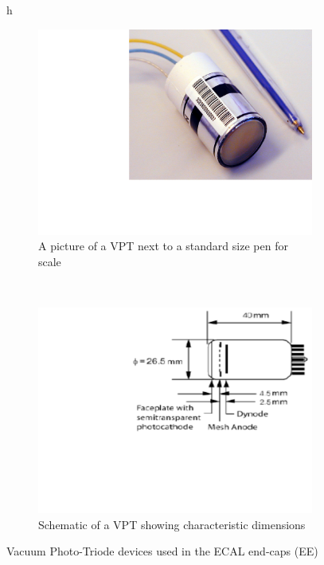 \begin{figure}{h}
    \centering
    \begin{subfigure}[h]{0.450\textwidth}
        \includegraphics[width=\textwidth]{Figures/CMS_Diagrams/ECAL__VPT.pdf}
        \caption{A picture of a VPT next to a standard size pen for
          scale \cite{CMS:ecal_vpt_with_pen}}\label{fig:ecal_vpt_pic}
      \end{subfigure}
      ~ %
    \begin{subfigure}[h]{0.450\textwidth}
        \includegraphics[width=\textwidth]{Figures/CMS_Diagrams/ECAL__VPT_schematic.pdf}
        \caption{Schematic of a VPT showing characteristic dimensions \cite{Brown:2001ia}}\label{fig:ecal_vpt_schematic}
      \end{subfigure}
      \caption{Vacuum Photo-Triode devices used in the ECAL end-caps
        (EE)}\label{fig:ecal_vpt}
\end{figure}

